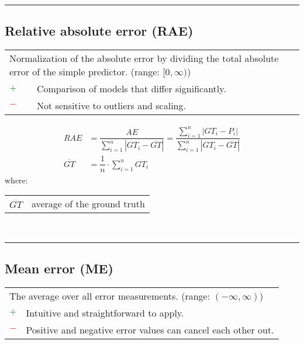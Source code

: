 \documentclass{article}
\makeatletter
\newenvironment{conditions}[1][where:]
	{\hspace{0.02\textwidth} #1 \begin{tabular}[t]{>{$}l<{$} @{${}={}$} l}}
	{\end{tabular}\\[\belowdisplayskip]}
\makeatother
\begin{document}
\hrule


\subsection[Relative absolute error (RAE)]{Relative absolute error (RAE) \cite{armstrong1992error, armstrong2000another, rodrigues2017machine}}

\begin{table}[H]\centering
	\begin{tabular}{m{}m{}}
		\multicolumn{2}{m{0.95\textwidth}}{Normalization of the absolute error by dividing the total absolute error of the simple predictor. (range: $[0, \infty)$)} \\
		\textcolor{Green}{$+$} & Comparison of models that differ significantly. \\
		\textcolor{Red}{$-$}   & Not sensitive to outliers and scaling.
	\end{tabular}
\end{table}

\begin{equation}
	\begin{aligned}
		\textit{RAE}           &= \dfrac{\textit{AE}}{\sum\nolimits_{i = 1}^n |\textit{GT}_i - \overline{\textit{GT}}|} = \dfrac{\sum\nolimits_{i = 1}^n |\textit{GT}_i - P_i|}{\sum\nolimits_{i = 1}^n |\textit{GT}_i - \overline{\textit{GT}}|} \\
		\overline{\textit{GT}} &= \dfrac{1}{n} \cdot \sum\nolimits_{i = 1}^n \textit{GT}_i
%
		\label{equation:RAE}
	\end{aligned}
\end{equation}
%
\begin{conditions}
	\overline{\textit{GT}} & average of the ground truth
\end{conditions}

\hrule


\subsection[Mean error (ME)]{Mean error (ME) \cite{fisher1920012, anjali2019temperature}}

\begin{table}[H]\centering
	\begin{tabular}{m{}m{}}
		\multicolumn{2}{m{0.95\textwidth}}{The average over all error measurements. (range: $(-\infty, \infty)$)} \\
		\textcolor{Green}{$+$} & Intuitive and straightforward to apply. \\
		\textcolor{Red}{$-$}   & Positive and negative error values can cancel each other out.
	\end{tabular}
\end{table}
\end{document}
